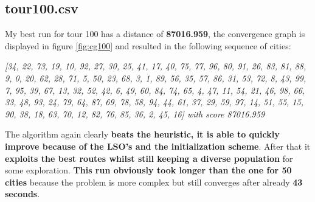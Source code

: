 \documentclass[a4paper,10pt]{article}
\begin{document}
\subsection{tour100.csv}
My best run for tour 100 has a distance of \textbf{87016.959}, the convergence graph is displayed in figure \ref{fig:cg100} and resulted in the following sequence of cities:
\begin{center}
\small
\textit{[34, 22, 73, 19, 10, 92, 27, 30, 25, 41, 17, 40, 75, 77, 96, 80, 91, 26, 83, 81, 88, 9, 0, 20, 62, 28, 71, 5, 50, 23, 68, 3, 1, 89, 56, 35, 57, 86, 31, 53, 72, 8, 43, 99, 7, 95, 39, 67, 13, 32, 52, 42, 6, 49, 60, 84, 74, 65, 4, 47, 11, 54, 21, 46, 98, 66, 33, 48, 93, 24, 79, 64, 87, 69, 78, 58, 94, 44, 61, 37, 29, 59, 97, 14, 51, 55, 15, 90, 38, 18, 63, 70, 12, 82, 76, 85, 36, 2, 45, 16] with score 87016.959}
\end{center}
The algorithm again clearly \textbf{beats the heuristic, it is able to quickly improve because of the LSO's and the initialization scheme}. After that it \textbf{exploits the best routes whilst still keeping a diverse population} for some exploration. \textbf{This run obviously took longer than the one for 50 cities} because the problem is more complex but still converges after already \textbf{43 seconds}.
\end{document}
